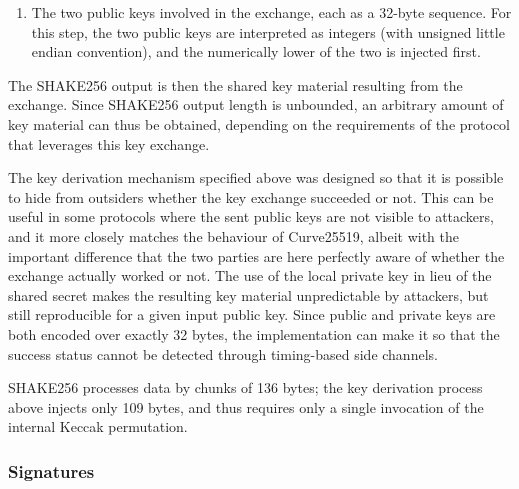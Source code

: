 \documentclass{llncs}
\begin{document}
\begin{itemize}
\begin{enumerate}
        \item The two public keys involved in the exchange, each as a
        32-byte sequence. For this step, the two public keys are
        interpreted as integers (with unsigned little endian convention),
        and the numerically lower of the two is injected first.

    \end{enumerate}
    The SHAKE256 output is then the shared key material resulting from
    the exchange. Since SHAKE256 output length is unbounded, an
    arbitrary amount of key material can thus be obtained, depending on
    the requirements of the protocol that leverages this key exchange.

\end{itemize}

The key derivation mechanism specified above was designed so that it is
possible to hide from outsiders whether the key exchange succeeded or
not. This can be useful in some protocols where the sent public keys are
not visible to attackers, and it more closely matches the behaviour of
Curve25519, albeit with the important difference that the two parties
are here perfectly aware of whether the exchange actually worked or not.
The use of the local private key in lieu of the shared secret makes the
resulting key material unpredictable by attackers, but still
reproducible for a given input public key. Since public and private keys
are both encoded over exactly 32 bytes, the implementation can make it
so that the success status cannot be detected through timing-based side
channels.

SHAKE256 processes data by chunks of 136 bytes; the key derivation
process above injects only 109 bytes, and thus requires only a single
invocation of the internal Keccak permutation.

\subsubsection{Signatures}
\end{document}
